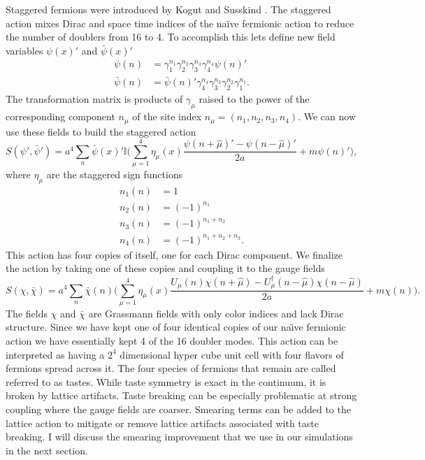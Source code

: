 Staggered fermions were introduced by Kogut and Susskind \cite{PhysRevD.11.395}.
The staggered action mixes Dirac and space time indices of the naïve fermionic action to reduce the number of doublers from 16 to 4.
To accomplish this lets define new field variables $\psi(x)'$ and $\bar{\psi}(x)'$
\begin{equation}
  \begin{aligned}
    \psi(n)&=\gamma_1^{n_1}\gamma_2^{n_2}\gamma_3^{n_3}\gamma_4^{n_4}\psi(n)'\\
    \bar{\psi}(n)&=\bar{\psi}(n)'\gamma_4^{n_4}\gamma_3^{n_3}\gamma_2^{n_2}\gamma_1^{n_1}.
  \end{aligned}
\end{equation}
The transformation matrix is products of $\gamma_\mu$ raised to the power of the corresponding component $n_\mu$ of the site index $n_\mu=(n_1,n_2,n_3,n_4)$.
We can now use these fields to build the staggered action
\begin{equation}
  S(\psi',\bar{\psi}')=a^4\sum_n \bar{\psi}(x)'\mathbb{I}\Big(\sum_{\mu=1}^4\eta_\mu(x)\frac{\psi(n+\hat{\mu})'-\psi(n-\hat{\mu})'}{2a}+m\psi(n)'\Big),
\end{equation}
where $\eta_\mu$ are the staggered sign functions
\begin{equation}
  \begin{aligned}
    n_1(n)&=1 \\
    n_2(n)&=(-1)^{n_1} \\
    n_3(n)&=(-1)^{n_1+n_2} \\
    n_4(n)&=(-1)^{n_1+n_2+n_3}.
  \end{aligned}
\end{equation}
This action has four copies of itself, one for each Dirac component.
We finalize the action by taking one of these copies and coupling it to the gauge fields
\begin{equation}
  S(\chi,\bar{\chi})=a^4\sum_n \bar{\chi}(n)\Big(\sum_{\mu=1}^4\eta_\mu(x)\frac{U_\mu(n)\chi(n+\hat{\mu})-U_\mu^\dagger(n-\hat{\mu})\chi(n-\hat{\mu})}{2a}+m\chi(n)\Big).
\end{equation}
The fields $\chi$ and $\bar{\chi}$ are Grassmann fields with only color indices and lack Dirac structure.
Since we have kept one of four identical copies of our na\"{\i}ve fermionic action we have essentially kept 4 of the 16 doubler modes.
This action can be interpreted as having a $2^4$ dimensional hyper cube unit cell with four flavors of fermions spread across it.
The four species of fermions that remain are called referred to as tastes.
While taste symmetry is exact in the continuum, it is broken by lattice artifacts.
Taste breaking can be especially problematic at strong coupling where the gauge fields are coarser.
Smearing terms can be added to the lattice action to mitigate or remove lattice artifacts associated with taste breaking.
I will discuss the smearing improvement that we use in our simulations in the next section.

